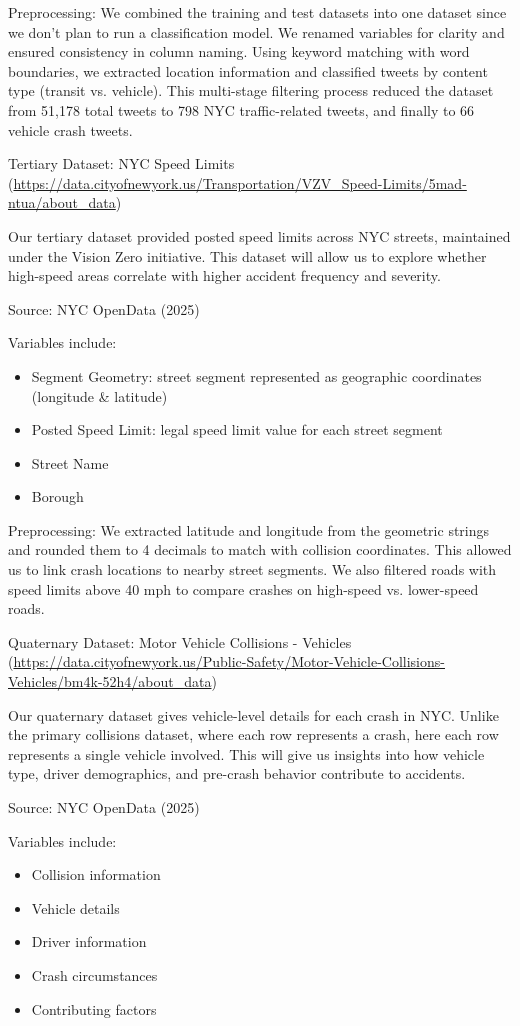 \documentclass[10pt]{article}\usepackage[]{graphicx}\usepackage[]{xcolor}
\begin{document}
Preprocessing: We combined the training and test datasets into one dataset since we don’t plan to run a classification model. We renamed variables for clarity and ensured consistency in column naming. Using keyword matching with word boundaries, we extracted location information and classified tweets by content type (transit vs. vehicle). This multi-stage filtering process reduced the dataset from 51,178 total tweets to 798 NYC traffic-related tweets, and finally to 66 vehicle crash tweets.

Tertiary Dataset: NYC Speed Limits (\url{https://data.cityofnewyork.us/Transportation/VZV_Speed-Limits/5mad-ntua/about_data}) 

Our tertiary dataset provided posted speed limits across NYC streets, maintained under the Vision Zero initiative. This dataset will allow us to explore whether high-speed areas correlate with higher accident frequency and severity.


Source: NYC OpenData (2025)


Variables include:
\begin{itemize}
  \item Segment Geometry: street segment represented as geographic coordinates (longitude \& latitude)
  \item Posted Speed Limit: legal speed limit value for each street segment
  \item Street Name
  \item Borough
\end{itemize}

Preprocessing: We extracted latitude and longitude from the geometric strings and rounded them to 4 decimals to match with collision coordinates. This allowed us to link crash locations to nearby street segments. We also filtered roads with speed limits above 40 mph to compare crashes on high-speed vs. lower-speed roads. 

Quaternary Dataset: Motor Vehicle Collisions - Vehicles (\url{https://data.cityofnewyork.us/Public-Safety/Motor-Vehicle-Collisions-Vehicles/bm4k-52h4/about_data}) 

Our quaternary dataset gives vehicle-level details for each crash in NYC. Unlike the primary collisions dataset, where each row represents a crash, here each row represents a single vehicle involved. This will give us insights into how vehicle type, driver demographics, and pre-crash behavior contribute to accidents.

Source: NYC OpenData (2025)


Variables include:
\begin{itemize}
  \item Collision information 
  \item Vehicle details 
  \item Driver information
  \item Crash circumstances 
  \item Contributing factors 
\end{itemize}
\end{document}
